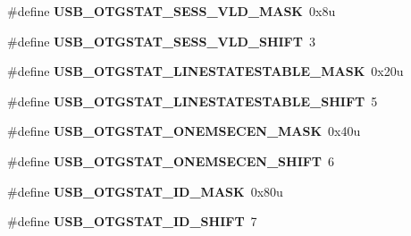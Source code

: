 \begin{DoxyCompactItemize}
\item 
\#define {\bfseries U\+S\+B\+\_\+\+O\+T\+G\+S\+T\+A\+T\+\_\+\+S\+E\+S\+S\+\_\+\+V\+L\+D\+\_\+\+M\+A\+SK}~0x8u\hypertarget{group__USB__Register__Masks_ga9158e279053f0f684c33cba2ec1e68ee}{}\label{group__USB__Register__Masks_ga9158e279053f0f684c33cba2ec1e68ee}

\item 
\#define {\bfseries U\+S\+B\+\_\+\+O\+T\+G\+S\+T\+A\+T\+\_\+\+S\+E\+S\+S\+\_\+\+V\+L\+D\+\_\+\+S\+H\+I\+FT}~3\hypertarget{group__USB__Register__Masks_ga69ae55ac7a03104ed013c34efa24ef43}{}\label{group__USB__Register__Masks_ga69ae55ac7a03104ed013c34efa24ef43}

\item 
\#define {\bfseries U\+S\+B\+\_\+\+O\+T\+G\+S\+T\+A\+T\+\_\+\+L\+I\+N\+E\+S\+T\+A\+T\+E\+S\+T\+A\+B\+L\+E\+\_\+\+M\+A\+SK}~0x20u\hypertarget{group__USB__Register__Masks_ga217f22f350652ae8ad2502c2baf8440b}{}\label{group__USB__Register__Masks_ga217f22f350652ae8ad2502c2baf8440b}

\item 
\#define {\bfseries U\+S\+B\+\_\+\+O\+T\+G\+S\+T\+A\+T\+\_\+\+L\+I\+N\+E\+S\+T\+A\+T\+E\+S\+T\+A\+B\+L\+E\+\_\+\+S\+H\+I\+FT}~5\hypertarget{group__USB__Register__Masks_ga34e5a04fe2a6546a9b22a40dc1f7c543}{}\label{group__USB__Register__Masks_ga34e5a04fe2a6546a9b22a40dc1f7c543}

\item 
\#define {\bfseries U\+S\+B\+\_\+\+O\+T\+G\+S\+T\+A\+T\+\_\+\+O\+N\+E\+M\+S\+E\+C\+E\+N\+\_\+\+M\+A\+SK}~0x40u\hypertarget{group__USB__Register__Masks_gaf29778bce4dce2841774778e5c566bf5}{}\label{group__USB__Register__Masks_gaf29778bce4dce2841774778e5c566bf5}

\item 
\#define {\bfseries U\+S\+B\+\_\+\+O\+T\+G\+S\+T\+A\+T\+\_\+\+O\+N\+E\+M\+S\+E\+C\+E\+N\+\_\+\+S\+H\+I\+FT}~6\hypertarget{group__USB__Register__Masks_gaac9cb5de36e29af8366533e2c05c31ac}{}\label{group__USB__Register__Masks_gaac9cb5de36e29af8366533e2c05c31ac}

\item 
\#define {\bfseries U\+S\+B\+\_\+\+O\+T\+G\+S\+T\+A\+T\+\_\+\+I\+D\+\_\+\+M\+A\+SK}~0x80u\hypertarget{group__USB__Register__Masks_gab1f78fae0de86d5ced423f41f9d6b098}{}\label{group__USB__Register__Masks_gab1f78fae0de86d5ced423f41f9d6b098}

\item 
\#define {\bfseries U\+S\+B\+\_\+\+O\+T\+G\+S\+T\+A\+T\+\_\+\+I\+D\+\_\+\+S\+H\+I\+FT}~7\hypertarget{group__USB__Register__Masks_ga4f674a8a6d13daeb25950cb78cfa625c}{}\label{group__USB__Register__Masks_ga4f674a8a6d13daeb25950cb78cfa625c}


\end{DoxyCompactItemize}

